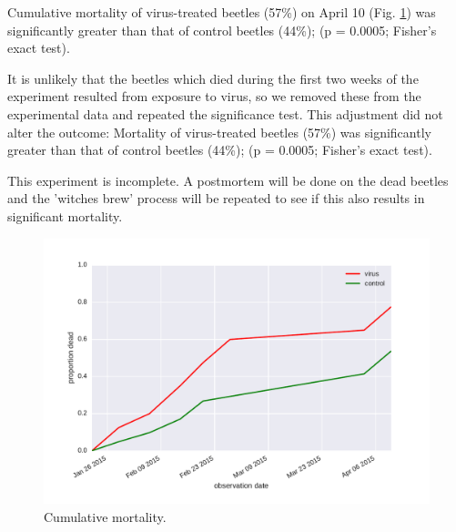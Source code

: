 \documentclass[letterpaper,11pt]{scrartcl}
\begin{document}
Cumulative mortality of virus-treated beetles (57\%) on April 10 (Fig. \ref{mortality}) was significantly greater than that of 
control beetles (44\%); (p = 0.0005; Fisher's exact test).
                         
It is unlikely that the beetles which died during the first two weeks of the experiment resulted from exposure
to virus, so we removed these from the experimental data and repeated the significance test. This adjustment 
did not alter the outcome: 
Mortality of virus-treated beetles (57\%) was significantly greater than that of control beetles (44\%);
(p = 0.0005; Fisher's exact test).
 
This experiment is incomplete. A postmortem will be done on the dead beetles and the 'witches brew' process
will be repeated to see if this also results in significant mortality.

 
\begin{figure}
\centering
\includegraphics[width = \textwidth]{wb1_mortality.pdf}
\caption{Cumulative mortality.}
\label{mortality}
\end{figure} 
 
 
%
%
\end{document}
